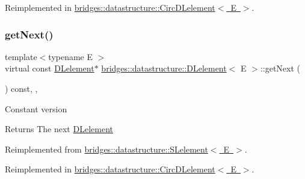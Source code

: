 Reimplemented in \mbox{\hyperlink{classbridges_1_1datastructure_1_1_circ_d_lelement_a80681d0382643a6df21da1bec4067004}{bridges\+::datastructure\+::\+Circ\+D\+Lelement$<$ E $>$}}.

\mbox{\label{classbridges_1_1datastructure_1_1_d_lelement_a8599e5be5fc1771d4e8a40f6de67b4a7}} 
\subsubsection{\texorpdfstring{get\+Next()}{getNext()}\hspace{0.1cm}{\footnotesize\ttfamily [2/2]}}
{\footnotesize\ttfamily template$<$typename E $>$ \\
virtual const \mbox{\hyperlink{classbridges_1_1datastructure_1_1_d_lelement}{D\+Lelement}}$\ast$ \mbox{\hyperlink{classbridges_1_1datastructure_1_1_d_lelement}{bridges\+::datastructure\+::\+D\+Lelement}}$<$ E $>$\+::get\+Next (\begin{DoxyParamCaption}{ }\end{DoxyParamCaption}) const\hspace{0.3cm}{\ttfamily [inline]}, {\ttfamily [override]}, {\ttfamily [virtual]}}

Constant version

\begin{DoxyReturn}{Returns}
The next \mbox{\hyperlink{classbridges_1_1datastructure_1_1_d_lelement}{D\+Lelement}} 
\end{DoxyReturn}


Reimplemented from \mbox{\hyperlink{classbridges_1_1datastructure_1_1_s_lelement_a8c62cb82fa64bbfe9ebb7334a5fea417}{bridges\+::datastructure\+::\+S\+Lelement$<$ E $>$}}.



Reimplemented in \mbox{\hyperlink{classbridges_1_1datastructure_1_1_circ_d_lelement_a3b54f07ffa49151ed13d8b8df964a4ee}{bridges\+::datastructure\+::\+Circ\+D\+Lelement$<$ E $>$}}.

\mbox{\label{classbridges_1_1datastructure_1_1_d_lelement_ac0b2dd38b3e3acee503152c9aa88f61c}} 
